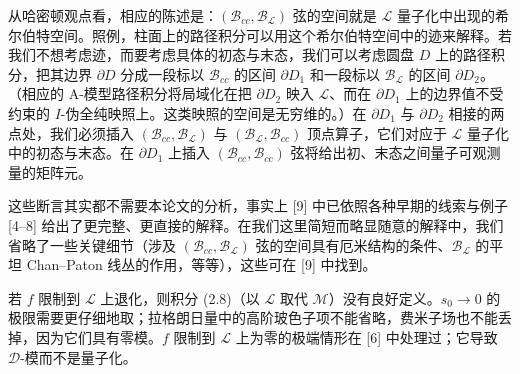 \documentclass[11pt,a4paper,UTF8]{ctexart}
\theoremstyle{plain}
\theoremstyle{definition}
\begin{document}
从哈密顿观点看，相应的陈述是：$(\mathcal{B}_{cc},\mathcal{B}_{\mathcal{L}})$ 弦的空间就是 $\mathcal{L}$ 量子化中出现的希尔伯特空间。照例，柱面上的路径积分可以用这个希尔伯特空间中的迹来解释。若我们不想考虑迹，而要考虑具体的初态与末态，我们可以考虑圆盘 $D$ 上的路径积分，把其边界 $\partial D$ 分成一段标以 $\mathcal{B}_{cc}$ 的区间 $\partial D_1$ 和一段标以 $\mathcal{B}_{\mathcal{L}}$ 的区间 $\partial D_2$。（相应的 A-模型路径积分将局域化在把 $\partial D_2$ 映入 $\mathcal{L}$、而在 $\partial D_1$ 上的边界值不受约束的 $I$-伪全纯映照上。这类映照的空间是无穷维的。）在 $\partial D_1$ 与 $\partial D_2$ 相接的两点处，我们必须插入 $(\mathcal{B}_{cc},\mathcal{B}_{\mathcal{L}})$ 与 $(\mathcal{B}_{\mathcal{L}},\mathcal{B}_{cc})$ 顶点算子，它们对应于 $\mathcal{L}$ 量子化中的初态与末态。在 $\partial D_1$ 上插入 $(\mathcal{B}_{cc},\mathcal{B}_{cc})$ 弦将给出初、末态之间量子可观测量的矩阵元。


这些断言其实都不需要本论文的分析，事实上 [9] 中已依照各种早期的线索与例子 [4--8] 给出了更完整、更直接的解释。在我们这里简短而略显随意的解释中，我们省略了一些关键细节（涉及 $(\mathcal{B}_{cc},\mathcal{B}_{\mathcal{L}})$ 弦的空间具有厄米结构的条件、$\mathcal{B}_{\mathcal{L}}$ 的平坦 Chan--Paton 线丛的作用，等等），这些可在 [9] 中找到。

若 $f$ 限制到 $\mathcal{L}$ 上退化，则积分 (2.8)（以 $\mathcal{L}$ 取代 $\mathcal{M}$）没有良好定义。$s_0\to0$ 的极限需要更仔细地取；拉格朗日量中的高阶玻色子项不能省略，费米子场也不能丢掉，因为它们具有零模。$f$ 限制到 $\mathcal{L}$ 上为零的极端情形在 [6] 中处理过；它导致 $\mathcal{D}$-模而不是量子化。
\end{document}

